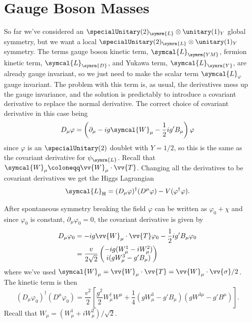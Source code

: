 \documentclass[fleqn]{NotesClass}
\newcommand{\Pparticle}[1]{\mathrm{#1}}
\newcommand{\Phiggs}{\ensuremath{\Pparticle{H}}}
\newcommand{\covariantDerivative}{D}
\newcommand{\hermit}{\dagger}
\newcommand{\lagrangianDensity}{\symcal{L}}
\newcommand{\Left}{\symrm{L}}
\begin{document}
    \section{Gauge Boson Masses}
    So far we've considered an \(\specialUnitary(2)_{\Left} \otimes \unitary(1)_Y\) global symmetry, but we want a local \(\specialUnitary(2)_{\Left} \otimes \unitary(1)_Y\) symmetry.
    The terms gauge boson kinetic term, \(\lagrangianDensity_{\symrm{YM}}\), fermion kinetic term, \(\lagrangianDensity_{\symrm{D}}\), and Yukawa term, \(\lagrangianDensity_{\symrm{Y}}\), are already gauge invariant, so we just need to make the scalar term \(\lagrangianDensity_{\varphi}\) gauge invariant.
    The problem with this term is, as usual, the derivatives mess up the gauge invariance, and the solution is predictably to introduce a covariant derivative to replace the normal derivative.
    The correct choice of covariant derivative in this case being
    \begin{equation}
        \covariantDerivative_\mu \varphi = \left( \partial_\mu - ig\symcal{W}_\mu - \frac{1}{2}ig'B_\mu \right)\varphi
    \end{equation}
    since \(\varphi\) is an \(\specialUnitary(2)\) doublet with \(Y = 1/2\), so this is the same as the covariant derivative for \(\psi_{\Left}\).
    Recall that \(\symcal{W}_\mu \coloneqq \vv{W}_\mu \cdot \vv{T}\).
    Changing all the derivatives to be covariant derivatives we get the Higgs Lagrangian
    \begin{equation}
        \lagrangianDensity_{\Phiggs} = (\covariantDerivative_\mu \varphi)^\hermit (\covariantDerivative^\mu \varphi) - V(\varphi^\hermit \varphi).
    \end{equation}
    
    After spontaneous symmetry breaking the field \(\varphi\) can be written as \(\varphi_0 + \chi\) and since \(\varphi_0\) is constant, \(\partial_\mu \varphi_0 = 0\), the covariant derivative is given by
    \begin{align}
        \covariantDerivative_\mu \varphi_0 &= -ig \vv{W}_\mu \cdot \vv{T} \varphi_0 - \frac{1}{2}ig'B_\mu \varphi_0\\
        &= \frac{v}{2\sqrt{2}} 
        \begin{pmatrix}
            -ig(W^1_\mu - iW^2_\mu)\\
            i(gW^3_\mu - g'B_\mu)
        \end{pmatrix}
    \end{align}
    where we've used \(\symcal{W}_\mu = \vv{W}_\mu \cdot \vv{T} = \vv{W}_\mu \cdot \vv{\sigma}/2\).
    The kinetic term is then
    \begin{equation}
        (\covariantDerivative_\mu \varphi_0)^\hermit (\covariantDerivative^\mu \varphi_0) = \frac{v^2}{2}\left[ \frac{g^2}{2}W_\mu^\hermit W^\mu + \frac{1}{4}(gW^3_\mu - g'B_\mu)(gW^{3\mu} - g'B^\mu) \right].
    \end{equation}
    Recall that \(W_\mu = (W^1_\mu + i W^2_\mu)/\sqrt{2}\).
    
\end{document}
